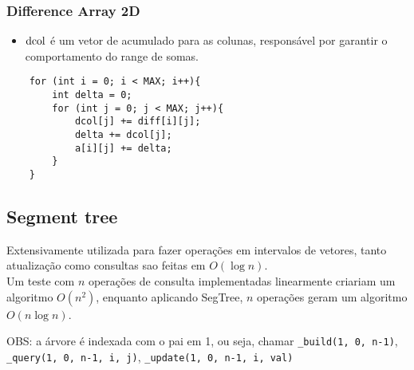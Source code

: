 \subsubsection{Difference Array 2D}
\begin{itemize}
    \item $\lstinline{dcol}$ é um vetor de acumulado para as colunas, responsável por garantir o comportamento do range de somas.
\end{itemize}

\begin{verbatim}
    for (int i = 0; i < MAX; i++){
        int delta = 0;
        for (int j = 0; j < MAX; j++){
            dcol[j] += diff[i][j];
            delta += dcol[j];
            a[i][j] += delta;
        }
    }
\end{verbatim}

\subsection{Segment tree}
\par Extensivamente utilizada para fazer operações em intervalos de vetores, tanto atualização como consultas sao feitas em $O(\log n)$. \\
Um teste com $n$ operações de consulta implementadas linearmente criariam um algoritmo $O(n^2)$, enquanto aplicando SegTree, $n$ operações geram um algoritmo $O(n\log n)$.
\par OBS: a árvore é indexada com o pai em 1, ou seja, chamar \lstinline{_build(1, 0, n-1)}, \lstinline{_query(1, 0, n-1, i, j)}, \lstinline{_update(1, 0, n-1, i, val)}

